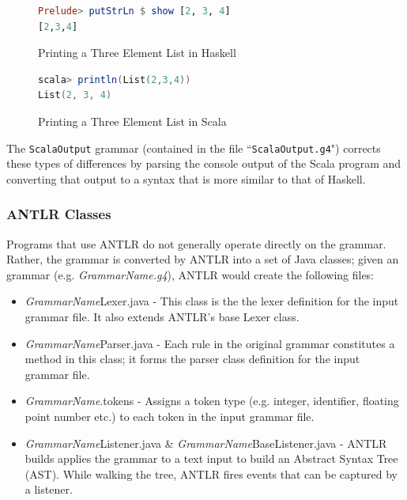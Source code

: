 \documentclass{report}
\begin{document}
\begin{figure}[H]
\begin{mdframed}
\begin{lstlisting}[language=Haskell]
Prelude> putStrLn $ show [2, 3, 4]
[2,3,4]
\end{lstlisting}
\end{mdframed}
\caption{Printing a Three Element List in Haskell}\label{fig:printListHaskell}
\end{figure}

\begin{figure}[H]
\begin{mdframed}
\begin{lstlisting}[language=Scala]
scala> println(List(2,3,4))
List(2, 3, 4)
\end{lstlisting}
\end{mdframed}
\caption{Printing a Three Element List in Scala}\label{fig:printListScala}
\end{figure}

The \texttt{ScalaOutput} grammar (contained in the file ``\texttt{ScalaOutput.g4}") corrects these types of differences by parsing the console output of the Scala program and converting that output to a syntax that is more similar to that of Haskell.

\subsubsection{ANTLR Classes}

Programs that use ANTLR do not generally operate directly on the grammar.  Rather, the grammar is converted by ANTLR into a set of Java classes; given an  grammar (e.g. \emph{GrammarName.g4}),  ANTLR would create the following files:

\begin{itemize}
	\item \emph{GrammarName}Lexer.java - This class is the the lexer definition for the input grammar file.  It also extends ANTLR's base Lexer class.
	
	\item \emph{GrammarName}Parser.java - Each rule in the original grammar constitutes a method in this class; it forms the parser class definition for the input grammar file.
	
	\item \emph{GrammarName}.tokens - Assigns a token type (e.g. integer, identifier, floating point number etc.) to each token in the input grammar file.
	
	\item \emph{GrammarName}Listener.java \& \emph{GrammarName}BaseListener.java - ANTLR builds applies the grammar to a text input to build an Abstract Syntax Tree (AST).  While walking the tree, ANTLR fires events that can be captured by a listener\cite{antlrDefinitiveReference}.
	
\end{itemize}
\end{document}
